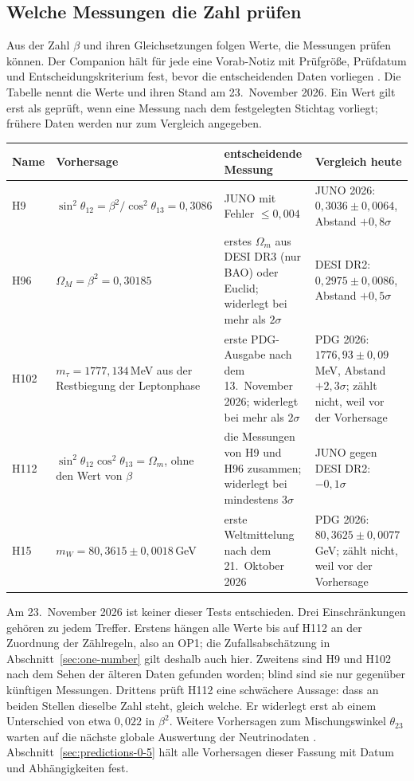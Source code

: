\subsection{Welche Messungen die Zahl prüfen}
\label{sec:data}

Aus der Zahl \(\beta\) und ihren Gleichsetzungen folgen Werte, die Messungen prüfen können. Der Companion hält für jede eine Vorab-Notiz
mit Prüfgröße, Prüfdatum und Entscheidungskriterium fest, bevor die entscheidenden Daten vorliegen \cite{predictions}. Die Tabelle
nennt die Werte und ihren Stand am 23.~November 2026. Ein Wert gilt erst als geprüft, wenn eine Messung nach dem festgelegten Stichtag
vorliegt; frühere Daten werden nur zum Vergleich angegeben.

\begin{center}
\small
\begin{tabular}{@{}p{.07\linewidth}p{.25\linewidth}p{.29\linewidth}p{.29\linewidth}@{}}
\hline
\textbf{Name} & \textbf{Vorhersage} & \textbf{entscheidende Messung} & \textbf{Vergleich heute}\\
\hline
H9 & \(\sin^2\theta_{12}=\beta^2/\cos^2\theta_{13}=0{,}3086\) & JUNO mit Fehler \(\le0{,}004\) & JUNO 2026: \(0{,}3036\pm0{,}0064\), Abstand \(+0{,}8\sigma\) \cite{juno2026}\\
H96 & \(\Omega_M=\beta^2=0{,}30185\) & erstes \(\Omega_m\) aus DESI DR3 (nur BAO) oder Euclid; widerlegt bei mehr als \(2\sigma\) & DESI DR2: \(0{,}2975\pm0{,}0086\), Abstand \(+0{,}5\sigma\) \cite{desi-dr2}\\
H102 & \(m_\tau=1777{,}134\)\,MeV aus der Restbiegung der Leptonphase & erste PDG-Ausgabe nach dem 13.~November 2026; widerlegt bei mehr als \(2\sigma\) & PDG 2026: \(1776{,}93\pm0{,}09\)\,MeV, Abstand \(+2{,}3\sigma\); zählt nicht, weil vor der Vorhersage \cite{pdg}\\
H112 & \(\sin^2\theta_{12}\cos^2\theta_{13}=\Omega_m\), ohne den Wert von \(\beta\) & die Messungen von H9 und H96 zusammen; widerlegt bei mindestens \(3\sigma\) & JUNO gegen DESI DR2: \(-0{,}1\sigma\)\\
H15 & \(m_W=80{,}3615\pm0{,}0018\)\,GeV & erste Weltmittelung nach dem 21.~Oktober 2026 & PDG 2026: \(80{,}3625\pm0{,}0077\)\,GeV; zählt nicht, weil vor der Vorhersage\\
\hline
\end{tabular}
\end{center}

Am 23.~November 2026 ist keiner dieser Tests entschieden. Drei Einschränkungen gehören zu jedem Treffer. Erstens hängen alle Werte bis
auf H112 an der Zuordnung der Zählregeln, also an OP1; die Zufallsabschätzung in Abschnitt~\ref{sec:one-number} gilt deshalb auch hier.
Zweitens sind H9 und H102 nach dem Sehen der älteren Daten gefunden worden; blind sind sie nur gegenüber künftigen Messungen. Drittens
prüft H112 eine schwächere Aussage: dass an beiden Stellen dieselbe Zahl steht, gleich welche. Er widerlegt erst ab einem Unterschied
von etwa \(0{,}022\) in \(\beta^2\). Weitere Vorhersagen zum Mischungswinkel \(\theta_{23}\) warten auf die nächste globale Auswertung
der Neutrinodaten \cite{predictions}. Abschnitt~\ref{sec:predictions-0-5} hält alle Vorhersagen dieser Fassung mit Datum und Abhängigkeiten fest.

